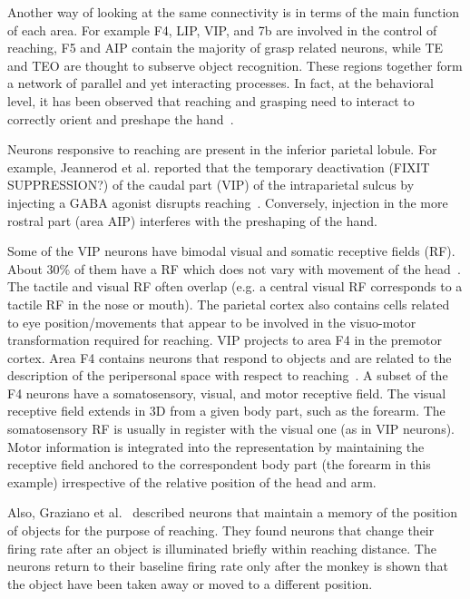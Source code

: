 Another way of looking at the same connectivity is in terms of the main 
function of each area. For example F4, LIP, VIP, and 7b are involved in the control of 
reaching, F5 and AIP contain the majority of grasp related neurons, 
while TE and TEO are thought to subserve object recognition. These regions together form a network 
of parallel and yet interacting processes. In fact, at the behavioral level, it has 
been observed that reaching and 
grasping need to interact to correctly orient and preshape the hand~\cite{jeannerod-arbib-rizzolatti-sakata-1995}.

Neurons responsive to reaching are present in the inferior parietal lobule. For 
example, Jeannerod et al. reported 
that the temporary deactivation (FIXIT SUPPRESSION?) of the caudal part (VIP) of the intraparietal sulcus by injecting a GABA 
agonist
disrupts reaching~\cite{jeannerod-arbib-rizzolatti-sakata-1995}. Conversely, injection in the more rostral part (area AIP) 
interferes with the
preshaping of the hand. 

Some of the VIP neurons have bimodal visual and somatic receptive 
fields (RF). About 30\% of them have a RF which does not vary with 
movement of the head~\cite{rizzolatti-fogassi-gallese-1997}. The tactile and 
visual RF often overlap (e.g. a central visual 
RF corresponds to a tactile RF in the nose or mouth). The parietal cortex also contains 
cells related to eye position/movements that appear to be involved in  
the visuo-motor transformation required for reaching. VIP projects to area 
F4 in the premotor cortex. Area F4 contains neurons that respond to objects and 
are related to the description of the peripersonal space with respect to reaching~\cite{graziano-hu-gross-1997,fogassi96coding}. A subset of the F4 neurons 
have a somatosensory, visual, and motor receptive field. The visual receptive 
field extends in 3D from a given body part, such as the forearm. The somatosensory RF
is usually in register with the visual one (as in VIP neurons). Motor information
is integrated into the representation by maintaining the receptive
field anchored to the correspondent body part (the forearm in this
example) irrespective of the relative position of the head and arm.

Also, Graziano et al.~\cite{graziano-cooke-taylor-2000} described neurons that maintain a 
memory of the position of objects for the purpose of reaching. They found neurons 
that change their firing rate after an object is illuminated briefly
within reaching distance. The neurons return 
to their baseline firing rate only after the monkey is shown that the object have been 
taken away or moved to a different position.


